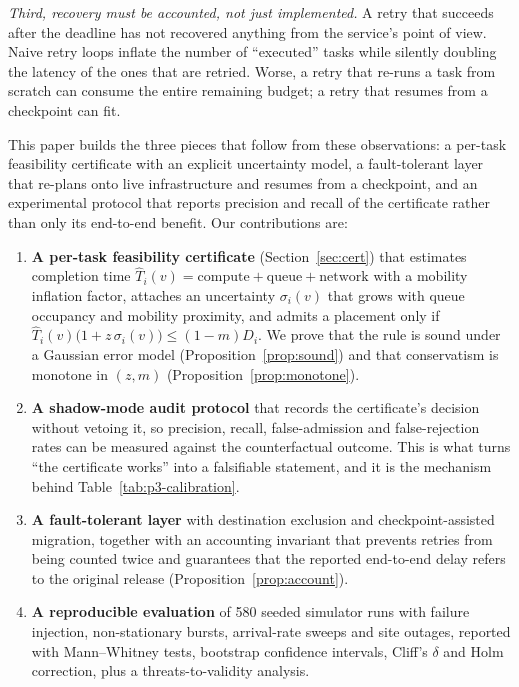 \documentclass[journal,10pt]{IEEEtran}
\newcommand{\T}{\ensuremath{\hat{T}}}
\newcommand{\sig}{\ensuremath{\sigma}}
\begin{document}
\emph{Third, recovery must be accounted, not just implemented.} A retry that
succeeds after the deadline has not recovered anything from the service's point
of view. Naive retry loops inflate the number of ``executed'' tasks while
silently doubling the latency of the ones that are retried. Worse, a retry that
re-runs a task from scratch can consume the entire remaining budget; a retry
that resumes from a checkpoint can fit.

This paper builds the three pieces that follow from these observations: a
per-task feasibility certificate with an explicit uncertainty model, a
fault-tolerant layer that re-plans onto live infrastructure and resumes from a
checkpoint, and an experimental protocol that reports precision and recall of
the certificate rather than only its end-to-end benefit. Our contributions are:

\begin{enumerate}
\item \textbf{A per-task feasibility certificate} (Section~\ref{sec:cert}) that
  estimates completion time $\T_i(v)=\text{compute}+\text{queue}+\text{network}$
  with a mobility inflation factor, attaches an uncertainty
  $\sig_i(v)$ that grows with queue occupancy and mobility proximity, and admits
  a placement only if $\T_i(v)\bigl(1+z\,\sig_i(v)\bigr)\le(1-m)D_i$. We prove
  that the rule is sound under a Gaussian error model
  (Proposition~\ref{prop:sound}) and that conservatism is monotone in $(z,m)$
  (Proposition~\ref{prop:monotone}).
\item \textbf{A shadow-mode audit protocol} that records the certificate's
  decision without vetoing it, so precision, recall, false-admission and
  false-rejection rates can be measured against the counterfactual outcome.
  This is what turns ``the certificate works'' into a falsifiable statement, and
  it is the mechanism behind Table~\ref{tab:p3-calibration}.
\item \textbf{A fault-tolerant layer} with destination exclusion and
  checkpoint-assisted migration, together with an accounting invariant that
  prevents retries from being counted twice and guarantees that the reported
  end-to-end delay refers to the original release (Proposition~\ref{prop:account}).
\item \textbf{A reproducible evaluation} of 580 seeded simulator runs with
  failure injection, non-stationary bursts, arrival-rate sweeps and site
  outages, reported with Mann--Whitney tests, bootstrap confidence intervals,
  Cliff's $\delta$ and Holm correction, plus a threats-to-validity analysis.
\end{enumerate}
\end{document}
